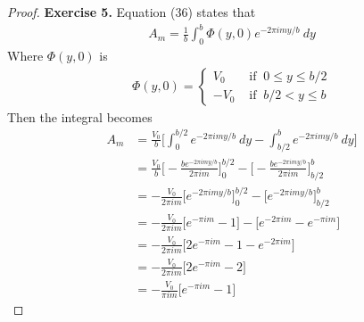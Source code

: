 \documentclass[11pt]{article}
\theoremstyle{definition}
\begin{document}
\cleardoublepage
\begin{proof}{\textbf{Exercise 5.}}
    Equation (36) states that
    \begin{align*}
        A_m = \frac{1}{b}\int_0^b \Phi(y, 0) e^{-2\pi i my/b}~dy
    \end{align*}
    Where $\Phi(y,0)$ is
    \begin{align*}
        \Phi(y, 0) = \begin{cases}
            V_0 &\text{ if }~0 \leq y \leq b/2 \\
            -V_0 &\text{ if }~b/2 < y \leq b 
        \end{cases}
    \end{align*}
    Then the integral becomes
    \begin{align*}
        A_m &= \frac{V_0}{b}\bigg[\int_{0}^{b/2} e^{-2\pi i my/b}~dy
        - \int_{b/2}^b e^{-2\pi i my/b}~dy \bigg]\\
        &= \frac{V_0}{b}
        \bigg[-\frac{be^{-2\pi i my/b}}{2\pi im}\bigg]_0^{b/2}
        - \bigg[-\frac{be^{-2\pi i my/b}}{2\pi im}\bigg]_{b/2}^b\\
        &= -\frac{V_0}{2\pi im}
        \bigg[e^{-2\pi i my/b}\bigg]_0^{b/2}
        - \bigg[e^{-2\pi i my/b}\bigg]_{b/2}^b\\
        &= -\frac{V_0}{2\pi im}
        \bigg[e^{-\pi i m} - 1\bigg]
        - \bigg[e^{-2\pi i m} -e^{-\pi i m}\bigg]\\
        &= -\frac{V_0}{2\pi im}
        \bigg[2e^{-\pi i m} - 1 - e^{-2\pi i m}\bigg]\\
        &= -\frac{V_0}{2\pi im}\bigg[2e^{-\pi i m} - 2\bigg]\\
        &= -\frac{V_0}{\pi im}\bigg[e^{-\pi i m} - 1\bigg]
    \end{align*}

\end{proof}
\cleardoublepage
\end{document}
